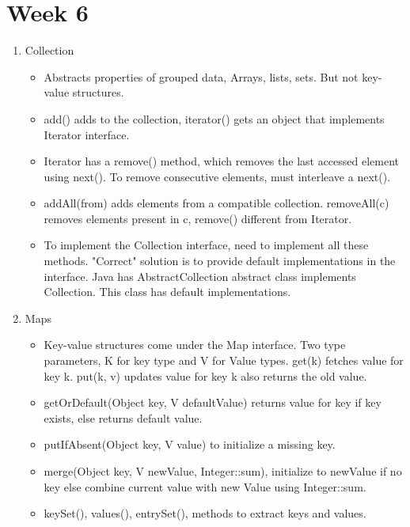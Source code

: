 \documentclass[a4paper]{article}
\begin{document}
\section{Week 6}
\begin{enumerate}
    \item Collection
    \begin{itemize}
        \item Abstracts properties of grouped data, Arrays, lists, sets. But not key-value structures.
        \item add() adds to the collection, iterator() gets an object that implements Iterator interface.
        \item Iterator has a remove() method, which removes the last accessed element using next(). To remove consecutive elements, must interleave a next().
        \item addAll(from) adds elements from a compatible collection. removeAll(c) removes elements present in c, remove() different from Iterator. 
        \item To implement the Collection interface, need to implement all these methods. "Correct" solution is to provide default implementations in the interface. Java has AbstractCollection abstract class implements Collection. This class has default implementations.
    \end{itemize}
    \item Maps
    \begin{itemize}
        \item Key-value structures come under the Map interface. Two type parameters, K for key type and V for Value types. get(k) fetches value for key k. put(k, v) updates value for key k also returns the old value.
        \item getOrDefault(Object key, V defaultValue) returns value for key if key exists, else returns default value.
        \item putIfAbsent(Object key, V value) to initialize a missing key.
        \item merge(Object key, V newValue, Integer::sum), initialize to newValue if no key else combine current value with new Value using Integer::sum.
        \item keySet(), values(), entrySet(), methods to extract keys and values.
    \end{itemize}
\end{enumerate}
\end{document}
